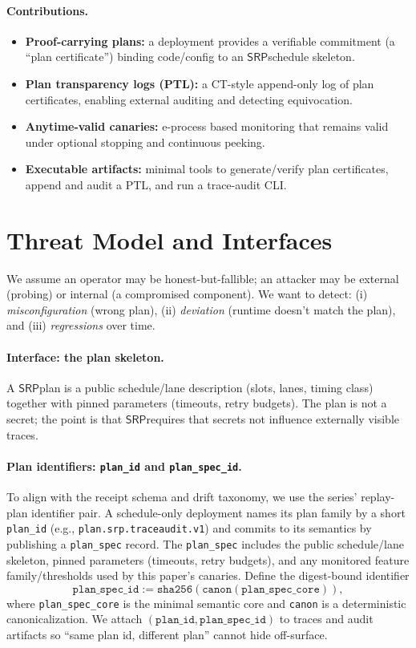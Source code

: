 \documentclass[11pt]{article}
\newcommand{\SRP}{\ensuremath{\mathsf{SRP}}}
\begin{document}
\paragraph{Contributions.}
\begin{itemize}[leftmargin=*]
  \item \textbf{Proof-carrying plans:} a deployment provides a verifiable commitment (a ``plan certificate'') binding code/config to an \SRP schedule skeleton.
  \item \textbf{Plan transparency logs (PTL):} a CT-style append-only log of plan certificates, enabling external auditing and detecting equivocation.
  \item \textbf{Anytime-valid canaries:} e-process based monitoring that remains valid under optional stopping and continuous peeking.
  \item \textbf{Executable artifacts:} minimal tools to generate/verify plan certificates, append and audit a PTL, and run a trace-audit CLI.
\end{itemize}

\section{Threat Model and Interfaces}
We assume an operator may be honest-but-fallible; an attacker may be external (probing) or internal (a compromised component).
We want to detect:
(i) \emph{misconfiguration} (wrong plan),
(ii) \emph{deviation} (runtime doesn't match the plan), and
(iii) \emph{regressions} over time.

\paragraph{Interface: the plan skeleton.}
A \SRP plan is a public schedule/lane description (slots, lanes, timing class) together with pinned parameters (timeouts, retry budgets).
The plan is not a secret; the point is that \SRP requires that secrets not influence externally visible traces.

\paragraph{Plan identifiers: \texttt{plan\_id} and \texttt{plan\_spec\_id}.}
To align with the receipt schema and drift taxonomy, we use the series' replay-plan identifier pair.\cite{series:receiptitems,series:planstateequiv}
A schedule-only deployment names its plan family by a short \texttt{plan\_id} (e.g., \texttt{plan.srp.traceaudit.v1}) and commits to its semantics by publishing a \texttt{plan\_spec} record.
The \texttt{plan\_spec} includes the public schedule/lane skeleton, pinned parameters (timeouts, retry budgets), and any monitored feature family/thresholds used by this paper's canaries.
Define the digest-bound identifier
\[
\texttt{plan\_spec\_id} := \texttt{sha256}(\texttt{canon}(\texttt{plan\_spec\_core})),
\]
where \texttt{plan\_spec\_core} is the minimal semantic core and \texttt{canon} is a deterministic canonicalization.\cite{series:planstateequiv}
We attach $(\texttt{plan\_id},\texttt{plan\_spec\_id})$ to traces and audit artifacts so ``same plan id, different plan'' cannot hide off-surface.
\end{document}
